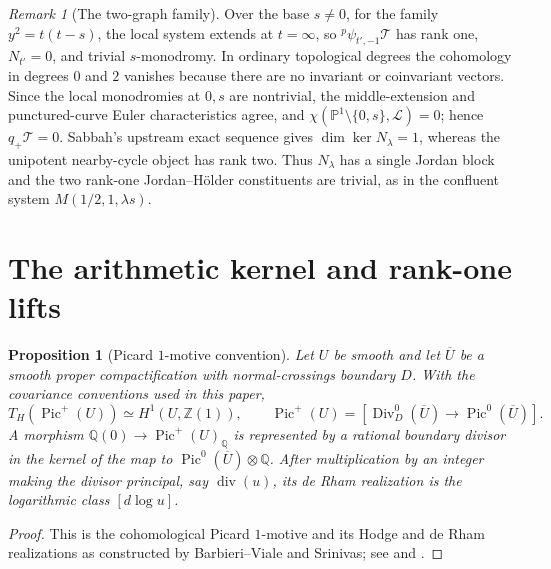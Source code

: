 \documentclass[11pt]{article}
\numberwithin{equation}{section}
\newtheorem{proposition}[proposition]{Proposition}
\theoremstyle{definition}
\theoremstyle{remark}
\newtheorem{remark}[remark]{Remark}
\newcommand{\Q}{\mathbb Q}
\newcommand{\Tcal}{\mathcal T}
\begin{document}
\begin{remark}[The two-graph family]\label{rem:two-graph}
Over the base $s\ne0$, for the family $y^2=t(t-s)$, the local system extends at $t=\infty$, so
${}^p\!\psi_{t',-1}\Tcal$ has rank one, $N_{t'}=0$, and trivial
$s$-monodromy.  In ordinary topological degrees the cohomology in degrees $0$ and $2$
vanishes because there are no invariant or coinvariant vectors. Since the
local monodromies at $0,s$ are nontrivial, the middle-extension and
punctured-curve Euler characteristics agree, and
$\chi(\mathbb P^1\setminus\{0,s\},\mathcal L)=0$; hence
$q_+\Tcal=0$.  Sabbah's upstream exact sequence gives
$\dim\ker N_\lambda=1$, whereas the unipotent nearby-cycle object has rank
two.  Thus $N_\lambda$ has a single Jordan block and the two rank-one
Jordan--H\"older constituents are trivial, as in the confluent system
$M(1/2,1,\lambda s)$.
\end{remark}

\section{The arithmetic kernel and rank-one lifts}\label{sec:arithmetic}

\begin{proposition}[Picard $1$-motive convention]
\label{prop:picard-convention}
Let $U$ be smooth and let $\overline U$ be a smooth proper compactification
with normal-crossings boundary $D$.  With the covariance conventions used in
this paper,
\begin{equation}\label{eq:pic-plus}
  T_H\!\left(\operatorname{Pic}^{+}(U)\right)
  \simeq H^1(U,\mathbb Z(1)),
  \qquad
  \operatorname{Pic}^{+}(U)
  =\left[\operatorname{Div}^{0}_{D}(\overline U)
     \longrightarrow\operatorname{Pic}^{0}(\overline U)\right].
\end{equation}
A morphism $\Q(0)\to\operatorname{Pic}^{+}(U)_{\Q}$ is represented by a
rational boundary divisor in the kernel of the map to
$\operatorname{Pic}^{0}(\overline U)\otimes\Q$.  After multiplication by an
integer making the divisor principal, say $\operatorname{div}(u)$, its de Rham
realization is the logarithmic class $[d\log u]$.
\end{proposition}

\begin{proof}
This is the cohomological Picard $1$-motive and its Hodge and de Rham
realizations as constructed by Barbieri--Viale and Srinivas; see
\cite[Sections~2--4]{BarbieriVialeSrinivas} and
\cite[Section~10]{DeligneHodgeIII}.
\end{proof}
\end{document}
